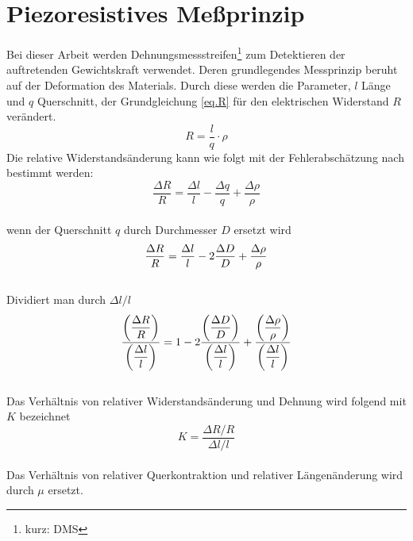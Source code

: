\documentclass[12pt]{scrreprt} %
\begin{document}
\section{Piezoresistives Meßprinzip}
Bei dieser Arbeit werden Dehnungsmessstreifen\footnote{kurz: DMS} zum Detektieren der auftretenden Gewichtskraft verwendet. Deren grundlegendes Messprinzip beruht auf der Deformation des Materials. Durch diese werden die Parameter, $l$ Länge und $q$ Querschnitt, der Grundgleichung \vref{eq.R} für den elektrischen Widerstand $R$ verändert. 
\begin{equation}
R = \frac{l}{q}\cdot \rho \label{eq.R}
\end{equation}
Die relative Widerstandsänderung kann wie folgt mit der Fehlerabschätzung nach \citep[S.234 ff.]{Schruefer2012} bestimmt werden:\\
\begin{equation}
\frac{\Delta R} {R} =\frac{\Delta l} {l}-\frac{\Delta q} {q}+\frac{\Delta \rho} {\rho}
\end{equation}\\
wenn der Querschnitt $q$ durch Durchmesser $D$ ersetzt wird\\
\begin{equation}
\frac{\Delta R} {R} =\frac{\Delta l} {l}-2\frac{\Delta D} {D}+\frac{\Delta \rho} {\rho}\\
\end{equation}\\
Dividiert man durch $\Delta l/ l$\\
\begin{equation}
\frac{\displaystyle\left(\frac{\Delta R} {R}\right)}{\displaystyle\left(\frac{\Delta l} {l}\right)} =1-2\frac{\displaystyle\left(\frac{\Delta D} {D}\right)}{\displaystyle\left(\frac{\Delta l} {l}\right)}+\frac{\displaystyle\left(\frac{\Delta \rho} {\rho}\right)}{\displaystyle\left(\frac{\Delta l} {l}\right)} \label{eq.R+}\\
\end{equation}\\
Das Verhältnis von relativer Widerstandsänderung und Dehnung wird folgend mit $K$ bezeichnet\\
\begin{equation}
K=\frac{\Delta R/ R}{\Delta l/ l}
\end{equation}\\
Das Verhältnis von relativer Querkontraktion und relativer Längenänderung wird durch $\mu$ ersetzt.\\
\end{document}
